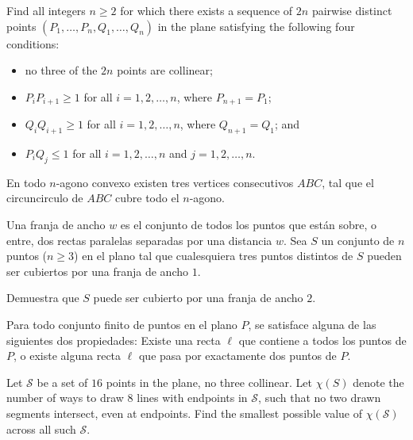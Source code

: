 \documentclass[11pt]{scrartcl}
\begin{document}
\begin{problem}
    Find all integers $n \geq 2$ for which there exists a sequence of $2n$ pairwise distinct points $(P_1, \dots, P_n, Q_1, \dots, Q_n)$ in the plane satisfying the following four conditions:

\begin{itemize}
    \item no three of the $2n$ points are collinear;

\item $P_iP_{i+1} \ge 1$ for all $i = 1, 2, \dots ,n$, where $P_{n+1}=P_1$;
\item $Q_iQ_{i+1} \ge 1$ for all $i = 1, 2, \dots, n$, where $Q_{n+1} = Q_1$; and
\item $P_iQ_j \le 1$ for all $i = 1, 2, \dots, n$ and $j = 1, 2, \dots, n$.
\end{itemize}
\end{problem}

\begin{problem}
    En todo $n$-agono convexo existen tres vertices consecutivos $ABC$, tal que el circuncirculo de $ABC$ cubre todo el $n$-agono.
\end{problem}

\begin{problem} %
    Una franja de ancho $w$ es el conjunto de todos los puntos que están sobre, o entre, dos rectas paralelas separadas por una distancia $w$. Sea $S$ un conjunto de $n$ puntos ($n \ge 3$) en el plano tal que cualesquiera tres puntos distintos de $S$ pueden ser cubiertos por una franja de ancho $1$.

Demuestra que $S$ puede ser cubierto por una franja de ancho $2$.
\end{problem}

\begin{problem} %
    Para todo conjunto finito de puntos en el plano $P$, se satisface alguna de las siguientes dos propiedades: Existe una recta $\ell$ que contiene a todos los puntos de $P$, o existe alguna recta $\ell$ que pasa por exactamente dos puntos de $P$.  
\end{problem}

\begin{problem} %
    Let $\mathcal S$ be a set of $16$ points in the plane, no three collinear. Let $\chi(S)$ denote the number of ways to draw $8$ lines with endpoints in $\mathcal S$, such that no two drawn segments intersect, even at endpoints. Find the smallest possible value of $\chi(\mathcal S)$ across all such $\mathcal S$.
\end{problem}
\end{document}
